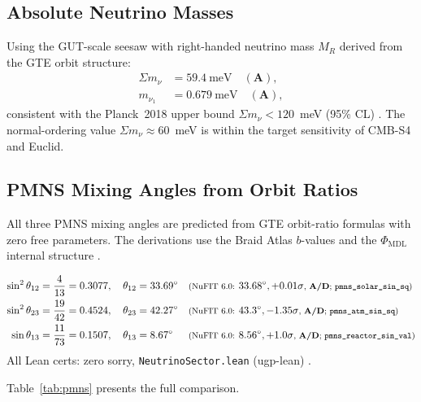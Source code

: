 \documentclass[11pt,openany]{book}
\theoremstyle{remark}
\newcommand{\PHIMDL}{\Phi_{\mathrm{MDL}}}
\newcommand{\lean}[1]{%
  \penalty-100
  \begingroup\def\_{\textunderscore\allowbreak}\texttt{#1}\endgroup}
\newcommand{\CatA}{\textbf{A}}
\newcommand{\CatAL}{\ensuremath{\textbf{A}_{\rm Lean}}}
\newcommand{\CatAD}{\textbf{A/D}}
\begin{document}
\subsection*{Absolute Neutrino Masses}

Using the GUT-scale seesaw with right-handed neutrino mass $M_R$ derived from the
GTE orbit structure:
\begin{align}
  \Sigma m_\nu &= 59.4~\text{meV} \quad (\CatA),
  \label{eq:mnu_sum}\\
  m_{\nu_1} &= 0.679~\text{meV} \quad (\CatA),
\end{align}
consistent with the Planck~2018 upper bound $\Sigma m_\nu < 120$~meV (95\% CL) \cite{SpivackNeutrino}.
The normal-ordering value $\Sigma m_\nu \approx 60$~meV is within the target
sensitivity of CMB-S4 and Euclid.

\subsection*{PMNS Mixing Angles from Orbit Ratios}

All three PMNS mixing angles are predicted from GTE orbit-ratio formulas with zero
free parameters.  The derivations use the Braid Atlas $b$-values and the
$\PHIMDL$ internal structure \cite{SpivackNeutrino,SpivackBraidAtlas}.

\begin{tcolorbox}[colback=green!5,colframe=green!50!black,title={PMNS Angle Predictions (\CatAD/\CatAL)}]
\begin{align*}
\sin^2\theta_{12} &= \frac{4}{13} = 0.3077,\quad\theta_{12}=33.69^\circ
  &&{\footnotesize\text{(NuFIT 6.0: }33.68^\circ, +0.01\sigma\text{, \CatAD; \lean{pmns\_solar\_sin\_sq})}}\\
\sin^2\theta_{23} &= \frac{19}{42} = 0.4524,\quad\theta_{23}=42.27^\circ
  &&{\footnotesize\text{(NuFIT 6.0: }43.3^\circ, -1.35\sigma\text{, \CatAD; \lean{pmns\_atm\_sin\_sq})}}\\
\sin\theta_{13}  &= \frac{11}{73} = 0.1507,\quad\theta_{13}=8.67^\circ
  &&{\footnotesize\text{(NuFIT 6.0: }8.56^\circ, +1.0\sigma\text{, \CatAD; \lean{pmns\_reactor\_sin\_val})}}
\end{align*}
All Lean certs: zero sorry, \texttt{NeutrinoSector.lean} (ugp-lean)
\cite{SpivackNeutrino}.
\end{tcolorbox}

Table~\ref{tab:pmns} presents the full comparison.
\end{document}
